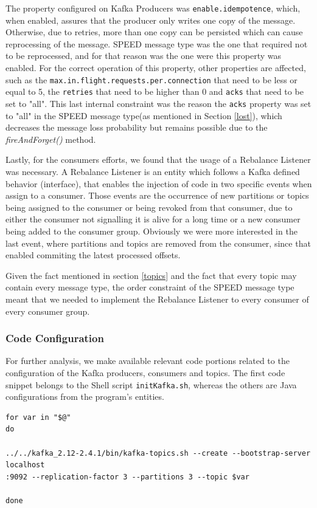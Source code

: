 \documentclass[12pt]{article}
\begin{document}
The property configured on Kafka Producers was \texttt{enable.idempotence}, which, when enabled, assures that the producer only writes one copy of the message. 
Otherwise, due to retries, more than one copy can be persisted which can cause reprocessing of the message. 
SPEED message type was the one that required not to be reprocessed, and for that reason was the one were this property was enabled. 
For the correct operation of this property, other properties are affected, such as the \texttt{max.in.flight.requests.per.connection} that need to be less or 
equal to 5, the \texttt{retries} that need to be higher than 0 and \texttt{acks} that need to be set to "all". 
This last internal constraint was the reason the \texttt{acks} property was set to "all" in the SPEED message type(as mentioned in Section \ref{lost}), which 
decreases the message loss probability but remains possible due to the \textit{fireAndForget()} method.

Lastly, for the consumers efforts, we found that the usage of a Rebalance Listener was necessary. 
A Rebalance Listener is an entity which follows a Kafka defined behavior (interface), that enables the injection of code in two specific events when assign to a consumer. 
Those events are the occurrence of new partitions or topics being assigned to the consumer or being revoked from that consumer, due to either the consumer not 
signalling it is alive for a long time or a new consumer being added to the consumer group. 
Obviously we were more interested in the last event, where partitions and topics are removed from the consumer, since that enabled commiting the latest processed offsets.

Given the fact mentioned in section \ref{topics} and the fact that every topic may contain every message type, the order constraint of the SPEED message type meant that we needed to implement the Rebalance 
Listener to every consumer of every consumer group.

\newpage
\subsubsection{Code Configuration}

For further analysis, we make available relevant code portions related to the configuration of the Kafka producers, consumers and topics.
The first code snippet belongs to the Shell script \texttt{initKafka.sh}, whereas the others are Java configurations from the program's entities. 

\vspace{2pt}
\begingroup
\fontsize{9pt}{10pt}\selectfont
\begin{verbatim}
for var in "$@"
do

../../kafka_2.12-2.4.1/bin/kafka-topics.sh --create --bootstrap-server localhost
:9092 --replication-factor 3 --partitions 3 --topic $var

done
\end{verbatim}
\endgroup
\end{document}
